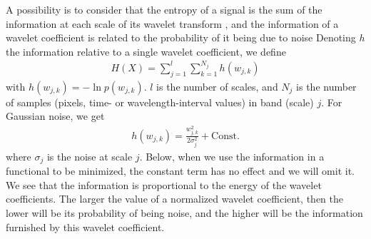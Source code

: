 \documentclass[11pt,a4paper]{article}
\begin{document}
A possibility is to consider that the 
entropy of a signal is the sum of the information at each scale of its
wavelet transform \cite{starck:sta98_2}, and the information of a wavelet 
coefficient is related to the probability of it being due to noise
Denoting  $h$ the information relative to a single wavelet coefficient,
we define
\begin{eqnarray}
H(X) = \sum_{j=1}^{l} \sum_{k=1}^{N_j}  h(w_{j,k}) 
\label{eqn_statwave}  
\end{eqnarray}
with $h(w_{j,k})  = - \ln p(w_{j,k})$.
 $l$ is the number of scales, and
$N_j$ is the number of samples (pixels, time- or wavelength-interval 
values) in band (scale) $j$. 
For Gaussian noise, we get
\begin{eqnarray}
 h(w_{j,k}) =  \frac{w_{j,k}^2}{2 \sigma_j^2} + \mbox{Const.}
\end{eqnarray}
where $\sigma_j$ is the noise at scale $j$.  Below, when we use the 
information in a functional to be minimized, the constant term has no effect
and we will omit it.
We see that the information is proportional
to the energy of the wavelet coefficients.
The larger the value of a normalized wavelet coefficient, 
then the lower will be 
its  probability of being noise, and the 
higher will
be the information furnished by this wavelet coefficient. 
\end{document}
